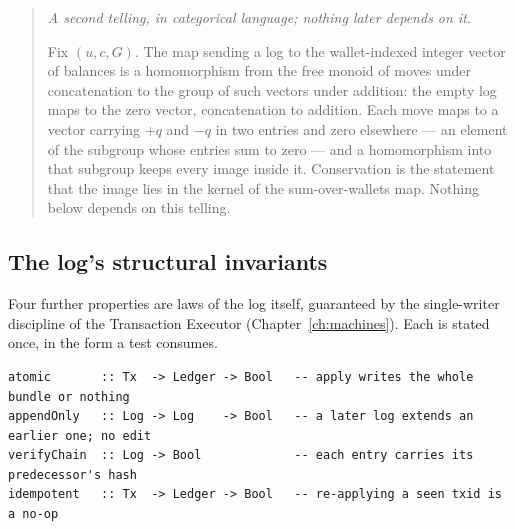 \documentclass[11pt,a4paper]{article}
\newenvironment{secondtelling}%
  {\par\medskip\noindent\begin{quote}\small\emph{A second telling, in categorical language; nothing later depends on it.}\par\smallskip}%
  {\end{quote}\medskip}
\begin{document}
\begin{secondtelling}
Fix $(u,c,G)$. The map sending a log to the wallet-indexed integer vector of
balances is a homomorphism from the free monoid of moves under concatenation to
the group of such vectors under addition: the empty log maps to the zero vector,
concatenation to addition. Each move maps to a vector carrying $+q$ and $-q$ in
two entries and zero elsewhere --- an element of the subgroup whose entries sum to
zero --- and a homomorphism into that subgroup keeps every image inside it.
Conservation is the statement that the image lies in the kernel of the
sum-over-wallets map. Nothing below depends on this telling.
\end{secondtelling}

\subsection{The log's structural invariants}

Four further properties are laws of the log itself, guaranteed by the
single-writer discipline of the Transaction Executor (Chapter~\ref{ch:machines}).
Each is stated once, in the form a test consumes.

\begin{lstlisting}
atomic       :: Tx  -> Ledger -> Bool   -- apply writes the whole bundle or nothing
appendOnly   :: Log -> Log    -> Bool   -- a later log extends an earlier one; no edit
verifyChain  :: Log -> Bool             -- each entry carries its predecessor's hash
idempotent   :: Tx  -> Ledger -> Bool   -- re-applying a seen txid is a no-op
\end{lstlisting}
\end{document}
